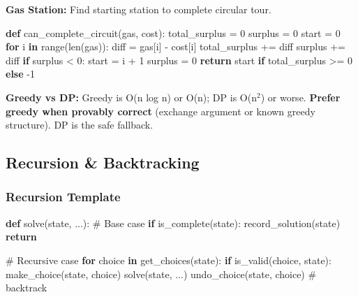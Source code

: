 \documentclass[11pt]{article}
\newenvironment{Shaded}{\begin{snugshade}}{\end{snugshade}}
\newcommand{\BuiltInTok}[1]{\textcolor[rgb]{0.50,0.55,0.55}{#1}}
\newcommand{\CommentTok}[1]{\textcolor[rgb]{0.48,0.49,0.49}{#1}}
\newcommand{\ControlFlowTok}[1]{\textcolor[rgb]{0.99,0.74,0.29}{\textbf{#1}}}
\newcommand{\DecValTok}[1]{\textcolor[rgb]{0.96,0.45,0.00}{#1}}
\newcommand{\KeywordTok}[1]{\textcolor[rgb]{0.81,0.81,0.76}{\textbf{#1}}}
\newcommand{\NormalTok}[1]{\textcolor[rgb]{0.81,0.81,0.76}{#1}}
\newcommand{\OperatorTok}[1]{\textcolor[rgb]{0.81,0.81,0.76}{#1}}
\begin{document}
\textbf{Gas Station:} Find starting station to complete circular tour.


\begin{Shaded}
\begin{Highlighting}[]
\KeywordTok{def}\NormalTok{ can\_complete\_circuit(gas, cost):}
\NormalTok{    total\_surplus }\OperatorTok{=} \DecValTok{0}
\NormalTok{    surplus }\OperatorTok{=} \DecValTok{0}
\NormalTok{    start }\OperatorTok{=} \DecValTok{0}
    \ControlFlowTok{for}\NormalTok{ i }\KeywordTok{in} \BuiltInTok{range}\NormalTok{(}\BuiltInTok{len}\NormalTok{(gas)):}
\NormalTok{        diff }\OperatorTok{=}\NormalTok{ gas[i] }\OperatorTok{{-}}\NormalTok{ cost[i]}
\NormalTok{        total\_surplus }\OperatorTok{+=}\NormalTok{ diff}
\NormalTok{        surplus }\OperatorTok{+=}\NormalTok{ diff}
        \ControlFlowTok{if}\NormalTok{ surplus }\OperatorTok{\textless{}} \DecValTok{0}\NormalTok{:}
\NormalTok{            start }\OperatorTok{=}\NormalTok{ i }\OperatorTok{+} \DecValTok{1}
\NormalTok{            surplus }\OperatorTok{=} \DecValTok{0}
    \ControlFlowTok{return}\NormalTok{ start }\ControlFlowTok{if}\NormalTok{ total\_surplus }\OperatorTok{\textgreater{}=} \DecValTok{0} \ControlFlowTok{else} \OperatorTok{{-}}\DecValTok{1}
\end{Highlighting}
\end{Shaded}

\textbf{Greedy vs DP:} Greedy is O(n log n) or O(n); DP is O(n\(^2\)) or worse. \textbf{Prefer greedy when provably correct} (exchange argument or known greedy structure). DP is the safe fallback.

\subsection{Recursion \& Backtracking}\label{recursion--backtracking}

\subsubsection{Recursion Template}\label{recursion-template}


\begin{Shaded}
\begin{Highlighting}[]
\KeywordTok{def}\NormalTok{ solve(state, ...):}
    \CommentTok{\# Base case}
    \ControlFlowTok{if}\NormalTok{ is\_complete(state):}
\NormalTok{        record\_solution(state)}
        \ControlFlowTok{return}

    \CommentTok{\# Recursive case}
    \ControlFlowTok{for}\NormalTok{ choice }\KeywordTok{in}\NormalTok{ get\_choices(state):}
        \ControlFlowTok{if}\NormalTok{ is\_valid(choice, state):}
\NormalTok{            make\_choice(state, choice)}
\NormalTok{            solve(state, ...)}
\NormalTok{            undo\_choice(state, choice)   }\CommentTok{\# backtrack}
\end{Highlighting}
\end{Shaded}
\end{document}
